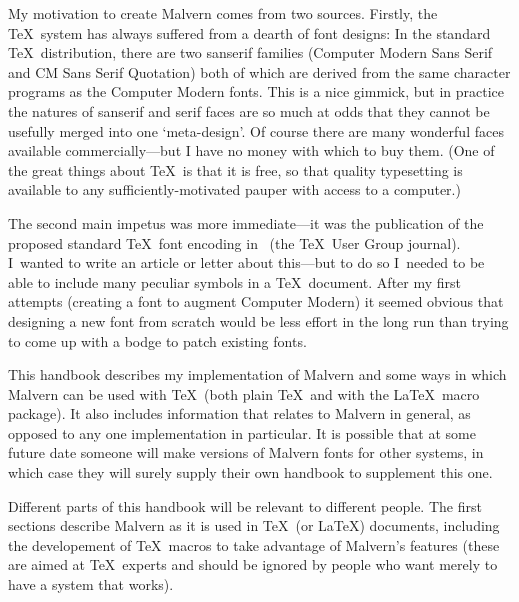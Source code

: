	My motivation to create Malvern comes from two sources.
	Firstly, the \TeX\ system has always suffered from a dearth of
	font designs: In the standard \TeX\ distribution, there are two
	sanserif families (Computer Modern Sans Serif and CM Sans Serif
	Quotation) both of which are derived from the same character
	programs as the Computer Modern fonts.  This is a nice gimmick,
	but in practice the natures of sanserif and serif faces are so
	much at odds that they cannot be usefully merged into one
	`meta-design'.
	Of course there are many wonderful faces available
	commercially---but I have no money with which to buy them.  (One
	of the great things about \TeX\ is that it is free, so that
	quality typesetting is available to any sufficiently-motivated
	pauper with access to a computer.)

	The second main impetus was more immediate---it was the
	publication of the proposed standard \TeX\ font encoding in
	\TUGboat\ (the \TeX\ User Group journal).  I~wanted to write an
	article or letter about this---but to do so I~needed to be able
	to include many peculiar symbols in a \TeX\ document.  After my
	first attempts (creating a font to augment Computer Modern) it
	seemed obvious that designing a new font from scratch would be
	less effort in the long run than trying to come up with a bodge
	to patch  existing fonts.
\fi

	This handbook describes my implementation of Malvern and some
	ways in which Malvern can be used with \TeX\ (both plain \TeX\
	and with the \LaTeX\ macro package).  
\iflong
	It also includes
	information that relates to Malvern in general, as opposed to
	any one implementation in particular.  It is possible that at
	some future date someone will make versions of Malvern fonts for
	other systems, in which case they will surely supply their own
	handbook to supplement this one.

	Different parts of this handbook will be relevant to different
	people.  The first sections describe Malvern as it is used in
	\TeX\ (or \LaTeX) documents, including the developement of \TeX\
	macros to take advantage of Malvern's features (these are aimed
	at \TeX\ experts and should be ignored by people who want merely
	to have a system that works).

